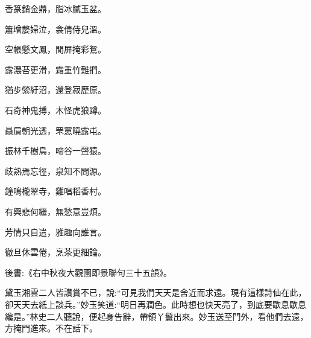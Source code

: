 \begin{poem}
    \begin{pl}香篆銷金鼎，脂冰膩玉盆。\end{pl}

    \begin{pl}簫增嫠婦泣，衾倩侍兒溫。\end{pl}

    \begin{pl}空帳懸文鳳，閒屏掩彩鴛。\end{pl}

    \begin{pl}露濃苔更滑，霜重竹難捫。\end{pl}

    \begin{pl}猶步縈紆沼，還登寂歷原。\end{pl}

    \begin{pl}石奇神鬼搏，木怪虎狼蹲。\end{pl}

    \begin{pl}贔屓朝光透，罘罳曉露屯。\end{pl}

    \begin{pl}振林千樹鳥，啼谷一聲猿。\end{pl}

    \begin{pl}歧熟焉忘徑，泉知不問源。\end{pl}

    \begin{pl}鐘鳴櫳翠寺，雞唱稻香村。\end{pl}

    \begin{pl}有興悲何繼，無愁意豈煩。\end{pl}

    \begin{pl}芳情只自遣，雅趣向誰言。\end{pl}

    \begin{pl}徹旦休雲倦，烹茶更細論。\end{pl}

\end{poem}


\begin{parag}
    後書:《右中秋夜大觀園即景聯句三十五韻》。
\end{parag}


\begin{parag}
    黛玉湘雲二人皆讚賞不已，說:“可見我們天天是舍近而求遠。現有這樣詩仙在此，卻天天去紙上談兵。”妙玉笑道:“明日再潤色。此時想也快天亮了，到底要歇息歇息纔是。”林史二人聽說，便起身告辭，帶領丫鬟出來。妙玉送至門外，看他們去遠，方掩門進來。不在話下。
\end{parag}


